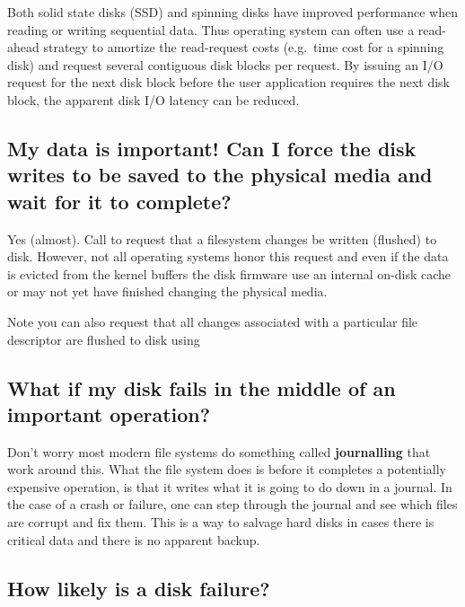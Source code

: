 Both solid state disks (SSD) and spinning disks have improved performance when reading or writing sequential data. Thus operating system can often use a read-ahead strategy to amortize the read-request costs (e.g.~time cost for a spinning disk) and request several contiguous disk blocks per request. By issuing an I/O request for the next disk block before the user application requires the next disk block, the apparent disk I/O latency can be reduced.

\subsection{My data is important! Can I force the disk writes to be saved to the physical media and wait for it to complete?}\label{my-data-is-important-can-i-force-the-disk-writes-to-be-saved-to-the-physical-media-and-wait-for-it-to-complete}

Yes (almost). Call  to request that a filesystem changes be written (flushed) to disk. However, not all operating systems honor this request and even if the data is evicted from the kernel buffers the disk firmware use an internal on-disk cache or may not yet have finished changing the physical media.

Note you can also request that all changes associated with a particular file descriptor are flushed to disk using 

\subsection{What if my disk fails in the middle of an important operation?}\label{what-if-my-disk-fails-in-the-middle-of-an-important-operation}

Don't worry most modern file systems do something called \textbf{journalling} that work around this. What the file system does is before it completes a potentially expensive operation, is that it writes what it is going to do down in a journal. In the case of a crash or failure, one can step through the journal and see which files are corrupt and fix them. This is a way to salvage hard disks in cases there is critical data and there is no apparent backup.

\subsection{How likely is a disk failure?}\label{how-likely-is-a-disk-failure}

